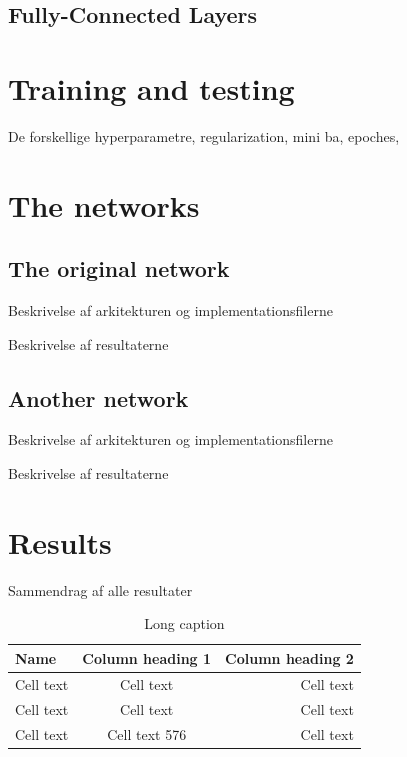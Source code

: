 \subsection{Fully-Connected Layers} %
\label{sub:fc_layers}



\section{Training and testing} %
\label{sec:training_and_testing}

De forskellige hyperparametre, regularization, mini ba, epoches, 


\section{The networks} %
\label{sec:the_networks}

\subsection{The original network} %
\label{sub:the_original_network}

Beskrivelse af arkitekturen og implementationsfilerne

Beskrivelse af resultaterne


\subsection{Another network} %
\label{sub:another_network}

Beskrivelse af arkitekturen og implementationsfilerne

Beskrivelse af resultaterne



\section{Results} %
\label{sec:results}

Sammendrag af alle resultater

\vspace{3 mm} %
\begin{table}[H]
\centering
\sffamily
\small
\begin{tabular}{l | c r}
\toprule
Name 			& Column heading 1 		& Column heading 2	\\
\midrule 
Cell text 	& Cell text					& Cell text			\\ 
Cell text 	& Cell text 				& Cell text 		\\ 
Cell text 	& Cell text 576				& Cell text			\\ 
\bottomrule 
\end{tabular}
\caption[Short caption]{Long caption}
\label{table:table lable}
\end{table}


